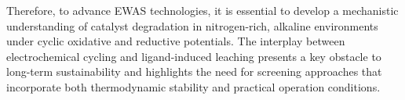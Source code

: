 \documentclass[journal=jacsat,manuscript=article]{achemso}
\begin{document}
Therefore, to advance EWAS technologies, it is essential to develop a mechanistic understanding of catalyst degradation in nitrogen-rich, alkaline environments under cyclic oxidative and reductive potentials. The interplay between electrochemical cycling and ligand-induced leaching presents a key obstacle to long-term sustainability and highlights the need for screening approaches that incorporate both thermodynamic stability and practical operation conditions.







\end{document}
